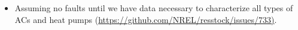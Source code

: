 \begin{itemize}
\item Assuming no faults until we have data necessary to characterize all types of ACs and heat pumps (\href{https://github.com/NREL/resstock/issues/733)}{https://github.com/NREL/resstock/issues/733)}.
\end{itemize}
